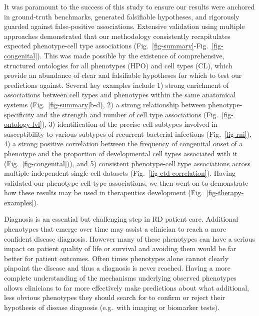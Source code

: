 \documentclass[
]{article}
\begin{document}
It was paramount to the success of this study to ensure our results were
anchored in ground-truth benchmarks, generated falsifiable hypotheses,
and rigorously guarded against false-positive associations. Extensive
validation using multiple approaches demonstrated that our methodology
consistently recapitulates expected phenotype-cell type associations
(Fig.~\ref{fig-summary}-Fig.~\ref{fig-congenital}). This was made
possible by the existence of comprehensive, structured ontologies for
all phenotypes (HPO) and cell types (CL), which provide an abundance of
clear and falsifiable hypotheses for which to test our predictions
against. Several key examples include 1) strong enrichment of
associations between cell types and phenotypes within the same
anatomical systems (Fig.~\ref{fig-summary}b-d), 2) a strong relationship
between phenotype-specificity and the strength and number of cell type
associations (Fig.~\ref{fig-ontology-lvl}), 3) identification of the
precise cell subtypes involved in susceptibility to various subtypes of
recurrent bacterial infections (Fig.~\ref{fig-rni}), 4) a strong
positive correlation between the frequency of congenital onset of a
phenotype and the proportion of developmental cell types associated with
it (Fig.~\ref{fig-congenital})), and 5) consistent phenotype-cell type
associations across multiple independent single-cell datasets
(Fig.~\ref{fig-ctd-correlation}). Having validated our phenotype-cell
type associations, we then went on to demonstrate how these results may
be used in therapeutics development (Fig.~\ref{fig-therapy-examples}).

Diagnosis is an essential but challenging step in RD patient care.
Additional phenotypes that emerge over time may assist a clinician to
reach a more confident disease diagnosis. However many of these
phenotypes can have a serious impact on patient quality of life or
survival and avoiding them would be far better for patient outcomes.
Often times phenotypes alone cannot clearly pinpoint the disease and
thus a diagnosis is never reached. Having a more complete understanding
of the mechanisms underlying observed phenotypes allows clinicians to
far more effectively make predictions about what additional, less
obvious phenotypes they should search for to confirm or reject their
hypothesis of disease diagnosis (e.g.~with imaging or biomarker tests).
\end{document}
